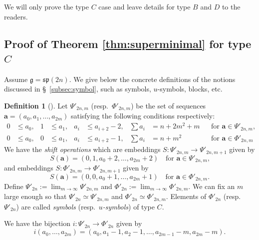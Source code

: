 \documentclass{amsart}
\theoremstyle{definition}
\newtheorem{definition}[theorem]{Definition}
\newcommand{\ba}{\mathbf{a}}
\newcommand{\g}{\mathfrak{g}}
\newcommand{\0}{\mathcal{O}}
\begin{document}
We will only prove the type $C$ case and leave details for type $B$ and $D$ to the readers.


\subsection{Proof of Theorem \ref{thm:superminimal} for type $C$}

Assume $\g = \mathfrak{sp}(2n)$. We give below the concrete definitions of the notions discussed in \S\, \ref{subsec:symbol}, such as symbols, $u$-symbols, blocks, etc.

\begin{definition}[{\cite[\S\,4.1]{Achar-Sage-special}}] \label{defn:symbol_C}
Let $\Psi'_{2n,m}$ (resp.~$\Phi'_{2n,m}$) be the set of
sequences $\ba = (a_0, a_1, \ldots, a_{2m})$ satisfying the following conditions respectively:
\begin{align*}
	0 &\le a_0, & 1 &\le a_1, & a_i &\le a_{i+2}-2, & \sum a_i &= n + 2m^2
	+ m & &\text{for $\ba \in \Psi'_{2n,m}$,} \\
	0 &\le a_0, & 0 &\le a_1, & a_i &\le a_{i+2}-1, & \sum a_i &= n + m^2 
	& &\text{for $\ba \in \Phi'_{2n,m}$}
\end{align*}
We have the \emph{shift operations} which are embeddings $S: \Psi'_{2n,m} \to \Psi'_{2n,m+1}$ given by
\[ 
	S(\ba) = (0,1,a_0+2,\ldots,a_{2m}+2) \quad \text{for $\ba \in \Psi'_{2n,m}$,} 
\]
and embeddings $S: \Phi'_{2n,m} \to \Phi'_{2n,m+1}$ given by
\[
	S(\ba) = (0,0,a_0+1,\ldots,a_{2m}+1) \quad \text{for $\ba \in
		\Phi'_{2n,m}$.} 
\]
Define $\Psi'_{2n} := \lim_{m\to \infty} \Psi'_{2n,m}$ and $\Phi'_{2n} := \lim_{m\to\infty} \Phi'_{2n,m}$.  We can fix an $m$
large enough so that $\Psi'_{2n} \simeq \Psi'_{2n,m}$ and $\Phi'_{2n} \simeq \Phi'_{2n,m}$.  Elements of $\Phi'_{2n}$ (resp.~$\Psi'_{2n}$) are called 
\emph{symbols} (resp.~\emph{$u$-symbols}) of type $C$.

We have the bijection $i: \Psi'_{2n} \to \Phi'_{2n}$ given by
\[
i(a_0, \ldots, a_{2m}) = (a_0, a_1 -1, a_2 -1, \ldots, a_{2m-1}-m, a_{2m}-m).
\]

\end{definition}
\end{document}
